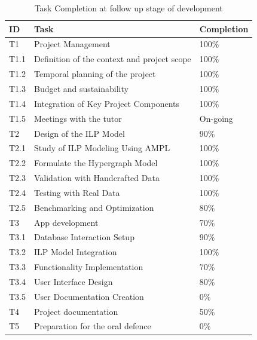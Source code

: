 \documentclass[12pt]{article}
\begin{document}
\begin{table}[!ht]
\centering
\begin{tabular}{|l|l|l|}
\hline \rowcolor{black!25}
ID & Task & Completion \\ 
\hline
\rowcolor{black!15}
T1 & Project Management & 100\% \\\hline
T1.1 & Definition of the context and project scope & 100\%\\\hline
T1.2 & Temporal planning of the project & 100\%\\\hline
T1.3 & Budget and sustainability & 100\%\\\hline
T1.4 & Integration of Key Project Components & 100\% \\\hline
T1.5 & Meetings with the tutor & On-going\\\hline
\rowcolor{black!15}
T2 & Design of the ILP Model & 90\%\\\hline
T2.1 & Study of ILP Modeling Using AMPL & 100\% \\\hline
T2.2 & Formulate the Hypergraph Model& 100\% \\\hline
T2.3 & Validation with Handcrafted Data &  100\% \\\hline
T2.4 & Testing with Real Data &  100\%\\\hline
T2.5 & Benchmarking and Optimization &  80\%\\\hline
\rowcolor{black!15}
T3 & App development & 70\% \\\hline
T3.1 & Database Interaction Setup & 90\% \\\hline
T3.2 & ILP Model Integration & 100\% \\\hline
T3.3 & Functionality Implementation & 70\%\\\hline
T3.4 & User Interface Design & 80\%\\\hline
T3.5 & User Documentation Creation & 0\% \\\hline
\rowcolor{black!15}
T4 & Project documentation  & 50\% \\\hline
\rowcolor{black!15}
T5 & Preparation for the oral defence & 0\% \\\hline
\end{tabular}
\caption{Task Completion at follow up stage of development} 
\label{tab:TaskCompletionAtFollowUp}
\end{table}
\end{document}
